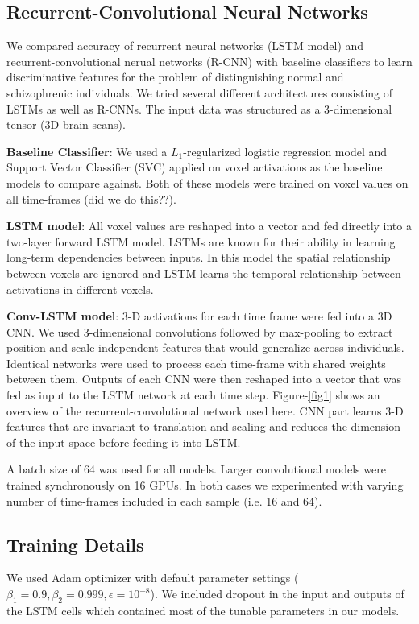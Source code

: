 \documentclass{article} %
\begin{document}
\subsection{Recurrent-Convolutional Neural Networks}
We compared accuracy of recurrent neural networks (LSTM model) and recurrent-convolutional nerual networks (R-CNN) with baseline classifiers to learn discriminative features for the problem of distinguishing normal and schizophrenic individuals. We tried several different architectures consisting of LSTMs as well as R-CNNs. The input data was structured as a 3-dimensional tensor (3D brain scans). 

\textbf{Baseline Classifier}: We used a $L_1$-regularized logistic regression model and Support Vector Classifier (SVC) applied on voxel activations as the baseline models to compare against. Both of these models were trained on voxel values on all time-frames (did we do this??). 

\textbf{LSTM model}: All voxel values are reshaped into a vector and fed directly into a two-layer forward LSTM model. LSTMs are known for their ability in learning long-term dependencies between inputs. In this model the spatial relationship between voxels are ignored and LSTM learns the temporal relationship between activations in different voxels. 

\textbf{Conv-LSTM model}: 3-D activations for each time frame were fed into a 3D CNN. We used 3-dimensional convolutions followed by max-pooling to extract position and scale independent features that would generalize across individuals. Identical networks were used to process each time-frame with shared weights between them. Outputs of each CNN were then reshaped into a vector that was fed as input to the LSTM network at each time step. Figure-\ref{fig1} shows an overview of the recurrent-convolutional network used here. CNN part learns 3-D features that are invariant to translation and scaling and reduces the dimension of the input space before feeding it into LSTM. 

A batch size of 64 was used for all models. Larger convolutional models were trained synchronously on 16 GPUs. In both cases we experimented with varying number of time-frames included in each sample (i.e. 16 and 64).

\subsection{Training Details}
\label{training_details}
We used Adam optimizer with default parameter settings ($\beta_1=0.9, \beta_2=0.999, \epsilon=10^{-8}$). We included dropout in the input and outputs of the LSTM cells \citep{Zaremba2014} which contained most of the tunable parameters in our models. 
\end{document}

